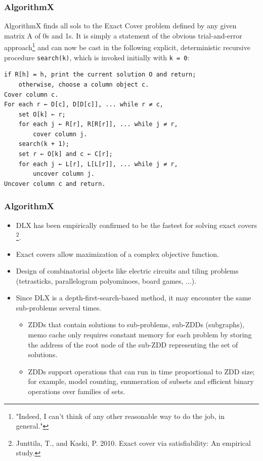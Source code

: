 \documentclass[10pt]{beamer}
\begin{document}
\begin{frame}[fragile]
\frametitle{AlgorithmX}
AlgorithmX finds all sols to the Exact Cover problem defined by any given matrix A of 0s and 1s. It is simply a statement of the obvious trial-and-error approach\footnote{"Indeed, I can’t think of any other reasonable way to do the job, in general."} and can now be cast in the following explicit, deterministic recursive procedure \verb|search(k)|, which is invoked initially with \verb|k = 0|:
\vfill
\begin{Verbatim}[fontsize=\small]
if R[h] = h, print the current solution O and return;
	otherwise, choose a column object c.
Cover column c.
For each r ← D[c], D[D[c]], ... while r ≠ c,
	set O[k] ← r;
	for each j ← R[r], R[R[r]], ... while j ≠ r,
		cover column j.
	search(k + 1);
	set r ← O[k] and c ← C[r];
	for each j ← L[r], L[L[r]], ... while j ≠ r,
		uncover column j.
Uncover column c and return.
\end{Verbatim}
\end{frame}

\begin{frame}[fragile]
\frametitle{AlgorithmX}
\begin{itemize}
	\item DLX has been empirically confirmed to be the fastest for solving exact covers
		\footnote{Junttila, T., and Kaski, P. 2010. Exact cover via satisfiability: An empirical study.}.
	\item Exact covers allow maximization of a complex objective function.
	\item Design of combinatorial objects like electric circuits and tiling problems (tetrasticks, parallelogram polyominoes, board games, ...).
	\item Since DLX is a depth-first-search-based method, it may encounter the same sub-problems several times.
	\begin{itemize}
		\item ZDDs that contain solutions to sub-problems, sub-ZDDs (subgraphs), memo cache only requires constant memory for each problem by storing the address of the root node of the sub-ZDD representing the set of solutions.
		\item ZDDs support operations that can run in time proportional to ZDD size; for example, model counting, enumeration of subsets and efficient binary operations over families of sets.
	\end{itemize}
\end{itemize}
\end{frame}
\end{document}
